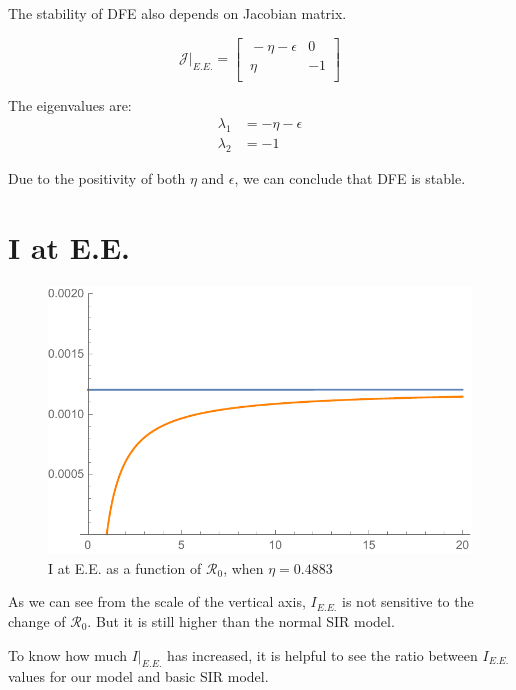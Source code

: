 \documentclass[12pt]{article}
\newcommand{\R}{\mathcal{R}}
\begin{document}
The stability of DFE also depends on Jacobian matrix.

\begin{equation}
\mathcal{J}|_{E.E.}=
\begin{bmatrix}
    \ -\eta-\epsilon       & 0 \\
    \ \eta       & -1 \\
\end{bmatrix}
\end{equation}

The eigenvalues are:
\begin{equation}
\begin{split}
\lambda_1&=-\eta-\epsilon\\
\lambda_2&=-1
\end{split}
\end{equation}

Due to the positivity of both $\eta$ and $\epsilon$, we can conclude that DFE is stable.

\section{I at E.E.}

\begin{figure}[H]
  \caption{I at E.E. as a function of $\R_0$, when $\eta=0.4883$}
  \includegraphics[width=1\textwidth]{Figures/Plot_I_at_EE_vary_R_0.pdf}
\end{figure}

As we can see from the scale of the vertical axis, $I_{E.E.}$ is not sensitive to the change of $\R_0$. But it is still higher than the normal SIR model.

To know how much $I|_{E.E.}$ has increased, it is helpful to see the ratio between $I_{E.E.}$ values for our model and basic SIR model.
\end{document}
